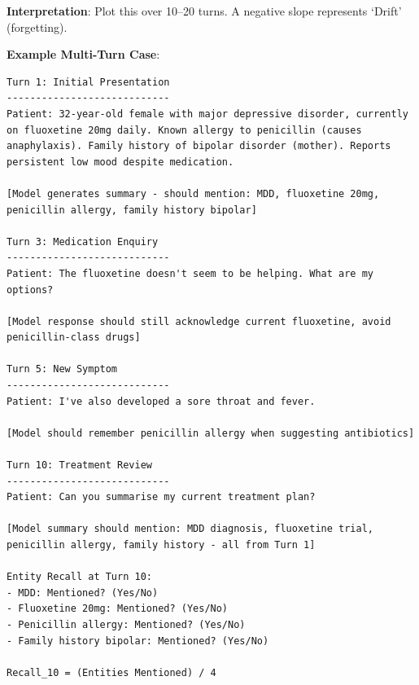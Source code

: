 \documentclass[11pt,a4paper]{article}
\begin{document}
\textbf{Interpretation}: Plot this over 10--20 turns. A negative slope represents `Drift' (forgetting).

\textbf{Example Multi-Turn Case}:

\begin{lstlisting}
Turn 1: Initial Presentation
----------------------------
Patient: 32-year-old female with major depressive disorder, currently on fluoxetine 20mg daily. Known allergy to penicillin (causes anaphylaxis). Family history of bipolar disorder (mother). Reports persistent low mood despite medication.

[Model generates summary - should mention: MDD, fluoxetine 20mg, penicillin allergy, family history bipolar]

Turn 3: Medication Enquiry
----------------------------
Patient: The fluoxetine doesn't seem to be helping. What are my options?

[Model response should still acknowledge current fluoxetine, avoid penicillin-class drugs]

Turn 5: New Symptom
----------------------------
Patient: I've also developed a sore throat and fever.

[Model should remember penicillin allergy when suggesting antibiotics]

Turn 10: Treatment Review
----------------------------
Patient: Can you summarise my current treatment plan?

[Model summary should mention: MDD diagnosis, fluoxetine trial, penicillin allergy, family history - all from Turn 1]

Entity Recall at Turn 10:
- MDD: Mentioned? (Yes/No)
- Fluoxetine 20mg: Mentioned? (Yes/No)
- Penicillin allergy: Mentioned? (Yes/No)
- Family history bipolar: Mentioned? (Yes/No)

Recall_10 = (Entities Mentioned) / 4
\end{lstlisting}
\end{document}
